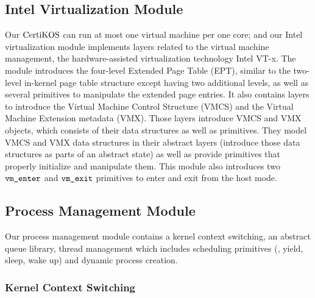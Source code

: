\subsection{Intel Virtualization Module}
\label{chapter:certikos:subsec:virtualization-module}

Our $\mathrm{CertiKOS}$ can run at most one virtual machine per one core;
and our Intel virtualization module implements layers related to the virtual machine management,
the hardware-assisted virtualization technology Intel VT-x.  
The module introduces the four-level Extended Page Table (EPT), 
similar to the two-level in-kernel page table structure except having  two additional levels, 
as well as several primitives to manipulate the extended page entries.
It also contains layers to introduce the Virtual Machine Control Structure (VMCS) and the
 Virtual Machine Extension metadata (VMX).
Those layers introduce VMCS and VMX objects, which consists of their data structures as well as primitives. 
They model VMCS and VMX data structures  in their 
 abstract layers (introduce those data structures as parts of an abstract state)
as well as provide primitives that properly initialize and manipulate them. 
This module also introduces two ${\mathrm{\texttt{vm\_enter}}}$ and ${\mathrm{\texttt{vm\_exit}}}$ primitives to enter and exit from the host mode.

\subsection{Process Management Module}
\label{chapter:certikos:subsec:process-management-module}
Our process management module contains 
a kernel context switching, an abstract queue library, thread management which includes scheduling primitives (\ie, yield, sleep, wake up)
and dynamic process creation. 

\subsubsection{Kernel Context Switching}


